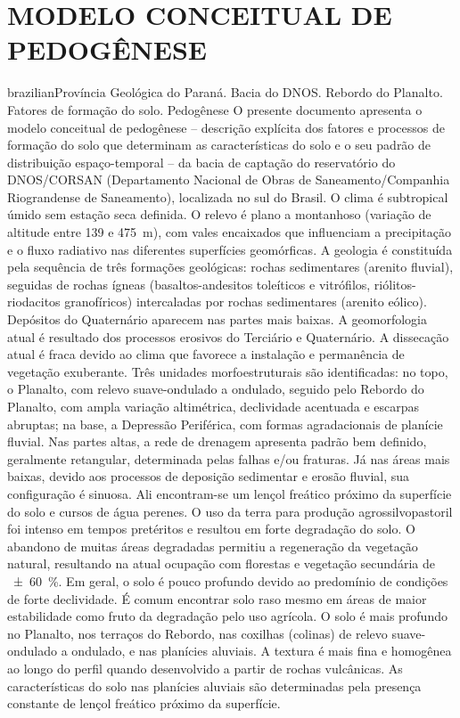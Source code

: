 \artigotrue
\chapter{MODELO CONCEITUAL DE PEDOGÊNESE}
\label{chap:chap03}


\def\ptkeys{Província Geológica do Paraná. Bacia do DNOS. Rebordo do Planalto. Fatores de formação do solo. 
Pedogênese}

\begin{chapterabstract}{brazilian}{\ptkeys}
O presente documento apresenta o modelo conceitual de pedogênese -- descrição explícita dos fatores e 
processos de formação do solo que determinam as características do solo e o seu padrão de distribuição 
espaço-temporal -- da bacia de captação do reservatório do DNOS/CORSAN (Departamento Nacional de Obras de 
Saneamento/Companhia Riograndense de Saneamento), localizada no sul do Brasil. O clima é 
subtropical úmido sem estação seca definida. O relevo é plano a montanhoso (variação de altitude entre 139 e 
\SI{475}{\m}), com vales encaixados que influenciam a precipitação e o fluxo radiativo nas diferentes 
superfícies geomórficas. A geologia é constituída pela sequência de três formações geológicas: rochas 
sedimentares 
(arenito fluvial), seguidas de rochas ígneas (basaltos-andesitos toleíticos e vitrófilos, riólitos-riodacitos 
granofíricos) intercaladas por rochas sedimentares (arenito eólico). Depósitos do Quaternário aparecem nas 
partes mais baixas. A geomorfologia atual é resultado dos processos erosivos do Terciário e Quaternário. A 
dissecação atual é fraca devido ao clima que favorece a instalação e permanência de vegetação exuberante. Três 
unidades morfoestruturais são identificadas: no topo, o Planalto, com relevo suave-ondulado a ondulado, 
seguido pelo Rebordo do Planalto, com ampla variação altimétrica, declividade acentuada e escarpas abruptas; na 
base, a Depressão Periférica, com formas agradacionais de planície fluvial. Nas partes altas, a rede de 
drenagem apresenta padrão bem definido, geralmente retangular, determinada pelas falhas e/ou fraturas. Já nas 
áreas mais baixas, devido aos processos de deposição sedimentar e erosão fluvial, sua configuração é sinuosa. 
Ali 
encontram-se um lençol freático próximo da superfície do solo e cursos de água perenes. O uso da terra para 
produção agrossilvopastoril foi intenso em tempos pretéritos e resultou em forte degradação do solo. O 
abandono 
de muitas áreas degradadas permitiu a regeneração da vegetação natural, resultando na atual ocupação com 
florestas e vegetação secundária de \SI{\pm60}{\percent}. Em geral, o solo é pouco profundo devido ao 
predomínio de condições de forte declividade. É comum encontrar solo raso mesmo em áreas de maior estabilidade 
como fruto da degradação pelo uso agrícola. O solo é mais profundo no Planalto, nos terraços do Rebordo, nas 
coxilhas (colinas) de relevo suave-ondulado a ondulado, e nas planícies aluviais. A textura é mais fina e 
homogênea ao 
longo do perfil quando desenvolvido a partir de rochas vulcânicas. As características do solo nas planícies 
aluviais são determinadas pela presença constante de lençol freático próximo da superfície.
\end{chapterabstract}

